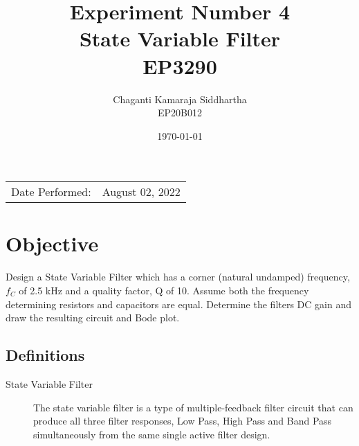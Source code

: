 \documentclass[
	letterpaper, %
	10pt, %
]{CSUniSchoolLabReport}
\title{Experiment Number 4\\State Variable Filter\\ EP3290} %
\author{Chaganti Kamaraja Siddhartha\\EP20B012} %
\date{\today} %
\begin{document}
\maketitle %

\begin{center}
	\begin{tabular}{l r}
		Date Performed: & August 02, 2022 \\ %
	\end{tabular}
\end{center}



\section{Objective}
Design a State Variable Filter which has a corner (natural undamped)
frequency, $f_C$ of 2.5 kHz and a quality factor, Q of 10. Assume both the frequency
determining resistors and capacitors are equal. Determine the filters DC gain and draw
the resulting circuit and Bode plot.

\subsection{Definitions}\label{definitions} %

\begin{description}
	\item[State Variable Filter] The state variable filter is a type of multiple-feedback filter circuit that can produce all three filter responses, Low Pass, High Pass and Band Pass simultaneously from the same single active filter design. 
\end{description} 
\end{document}
